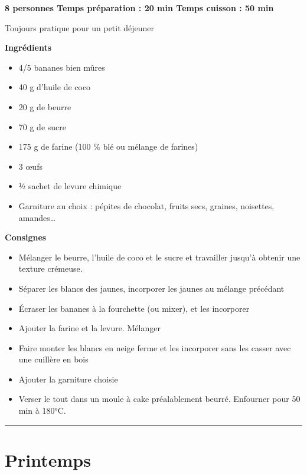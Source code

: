 \documentclass[]{book}
\providecommand{\tightlist}{%
  \setlength{\itemsep}{0pt}\setlength{\parskip}{0pt}}
\begin{document}
\begin{sucrebox}
\textbf{8 personnes \textbar{} Temps préparation : 20 min \textbar{}
Temps cuisson : 50 min}

Toujours pratique pour un petit déjeuner
\end{sucrebox}

\textbf{Ingrédients}

\begin{itemize}
\tightlist
\item
  4/5 bananes bien mûres
\item
  40 g d'huile de coco
\item
  20 g de beurre
\item
  70 g de sucre
\item
  175 g de farine (100 \% blé ou mélange de farines)
\item
  3 œufs
\item
  ½ sachet de levure chimique
\item
  Garniture au choix : pépites de chocolat, fruits secs, graines, noisettes, amandes\ldots{}
\end{itemize}

\textbf{Consignes}

\begin{itemize}
\tightlist
\item
  Mélanger le beurre, l'huile de coco et le sucre et travailler jusqu'à obtenir une texture crémeuse.
\item
  Séparer les blancs des jaunes, incorporer les jaunes au mélange précédant
\item
  Écraser les bananes à la fourchette (ou mixer), et les incorporer
\item
  Ajouter la farine et la levure. Mélanger
\item
  Faire monter les blancs en neige ferme et les incorporer sans les casser avec une cuillère en bois
\item
  Ajouter la garniture choisie
\item
  Verser le tout dans un moule à cake préalablement beurré. Enfourner pour 50 min à 180°C.
\end{itemize}

\begin{center}\rule{0.5\linewidth}{0.5pt}\end{center}

\hypertarget{printemps}{%
\chapter*{Printemps}\label{printemps}}
\end{document}
